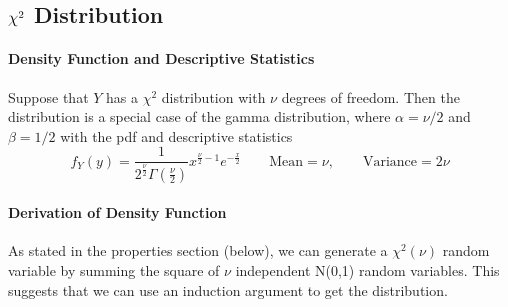 \documentclass[12pt]{article}
\theoremstyle{plain}
\theoremstyle{definition}
\theoremstyle{remark}
\newcommand*{\Chi}{\mbox{\large$\chi$}} %
\begin{document}
\subsection{$\Chi^2$ Distribution}

\paragraph{Density Function and Descriptive Statistics}
Suppose that $Y$ has a $\chi^2$ distribution with $\nu$ degrees
of freedom. Then the distribution is a special case of the gamma
distribution, where $\alpha = \nu/2$ and $\beta = 1/2$ with the pdf
and descriptive statistics
\begin{equation}
   f_Y(y) = \frac{1}{2^{\frac{\nu}{2}} \Gamma\left(\frac{\nu}{2}\right)}
      x^{\frac{\nu}{2} - 1} e^{-\frac{x}{2}} \qquad
\text{Mean} = \nu, \qquad \text{Variance} = 2 \nu
\end{equation}

\paragraph{Derivation of Density Function} As stated in the properties
section (below), we can generate a $\chi^2(\nu)$ random variable by
summing the square of $\nu$ independent N(0,1) random variables. This
suggests that we can use an induction argument to get the distribution.

\newpage
\end{document}
